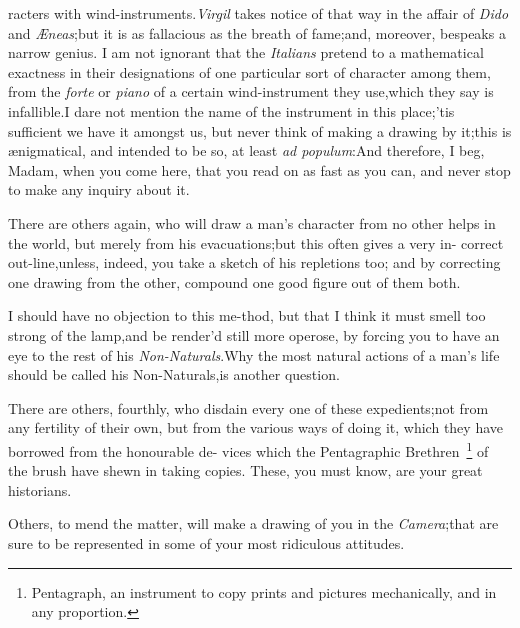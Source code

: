 \documentclass{article}
\begin{document}
\noindent
{}
racters with wind-instruments.\tsk  \textit{Virgil} takes notice
of that way in the affair of \textit{Dido} and
\textit{Æneas};\tsk  but it is as fallacious as the breath of
fame;\tsk  and, moreover, bespeaks a narrow genius. I am not
ignorant that the \textit{Italians} pretend to a mathematical
exactness in their designations of one particular sort of
character among them, from the \textit{forte} or \textit{piano}
of a certain wind-instrument they use,\tsk  which they say is
infallible.\tsk  I dare not mention the name of the instrument
in this place;\tsk  ’tis sufficient we have it amongst us,\tsk
but never think of making a drawing by it;\tsk  this is
ænigmatical, and intended to be so, at least \textit{ad
populum}:\tsk  And therefore, I beg, Madam, when you come here,
that you read on as fast as you can, and never stop to make any
inquiry about it.

There are others again, who will draw a man’s character
from no other helps in the world, but merely from his
evacuations;\tsk  but this often gives a very in-
correct out-line,\tsk  unless, indeed, you\break
take a sketch of his repletions too; and\break
by correcting one drawing from the\break
other, compound one good figure out of\break
them both.

I should have no objection to this me-\break thod, but that I think it
must smell too strong of the lamp,\tsk  and be render’d
still more operose, by forcing you to have an eye to the rest of
his \textit{Non-Naturals}.\tsk\break  Why the most natural actions of a
man’s life should be called his Non-Naturals,\tsk\break  is
another question.

There are others, fourthly, who disdain every one of these expedients;\tsk  not from
any fertility of their own, but from the various ways of doing it, which they have
borrowed from the honourable de- vices which the Pentagraphic
Brethren~\footnote{\enspace Pentagraph, an instrument to copy prints and pictures
mechanically, and in any proportion.} of the brush have shewn in
taking co\-pies.\tsk 
These, you must know, are your great historians.

\noindent
{}

Others, to mend the matter, will make a drawing of you in the
\textit{Camera};\tsk  that\break
{}
are sure to be represented in some of your most
ridiculous attitudes.
\end{document}
